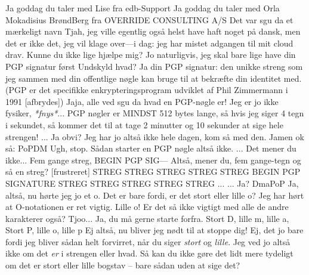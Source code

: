 \documentclass[a4paper,11pt]{article}
\begin{document}
\begin{sketch}

 Ja goddag du taler med Lise fra edb-Support
 Ja goddag du taler med Orla Mokadisius BrøndBerg fra OVERRIDE CONSULTING A/S
 Det var sgu da et mærkeligt navn
 Tjah, jeg ville egentlig også helst have haft noget på dansk, men det er ikke det, jeg vil klage over---i dag: jeg har mistet adgangen til mit cloud drav. Kunne du ikke lige hjælpe mig?
 Jo naturligvis, jeg skal bare lige have din PGP signatur først
 Undskyld hvad?
 Ja din PGP signatur: den unikke streng som jeg sammen med din offentlige nøgle kan bruge til at bekræfte din identitet med. (PGP er det specifikke enkrypteringsprogram udviklet af Phil Zimmermann i 1991 [afbrydes])
 Jaja, alle ved sgu da hvad en PGP-nøgle er! Jeg er jo ikke fysiker, \emph{*fnys*}... PGP nøgler er MINDST 512 bytes lange, så hvis jeg siger 4 tegn i sekundet, så kommer det til at tage 2 minutter og 10 sekunder at sige hele strengen!
 ... Ja obvi? Jeg har jo altså ikke hele dagen, kom så med den.
 Jamen ok så:
 PoPDM
 Ugh, stop. Sådan starter en PGP nøgle altså ikke.
 ... Det mener du ikke... Fem gange streg, BEGIN PGP SIG---
 Altså, mener du, fem gange-tegn og så en streg?
[frustreret] STREG STREG STREG STREG STREG BEGIN PGP SIGNATURE STREG STREG STREG STREG STREG ...
 ... Ja?
 DmaPoP
 Ja, altså, nu hørte jeg jo et o. Det er bare fordi, er det stort eller lille o? Jeg har hørt at O-notationen er ret vigtig.
 Lille o! Er det så ikke vigtigt med alle de andre karakterer også?
 Tjoo... Ja, du må gerne starte forfra.
 Stort D, lille m, lille a, Stort P, lille o, lille p
 Ej altså, nu bliver jeg nødt til at stoppe dig!
 Ej, det jo bare fordi jeg bliver sådan helt forvirret, når du siger \textit{stort} og \textit{lille}. Jeg ved jo altså ikke om det \textit{er} i strengen eller hvad. Så kan du ikke gøre det lidt mere tydeligt om det er stort eller lille bogstav -- bare sådan uden at sige det?

\end{sketch}
\end{document}
